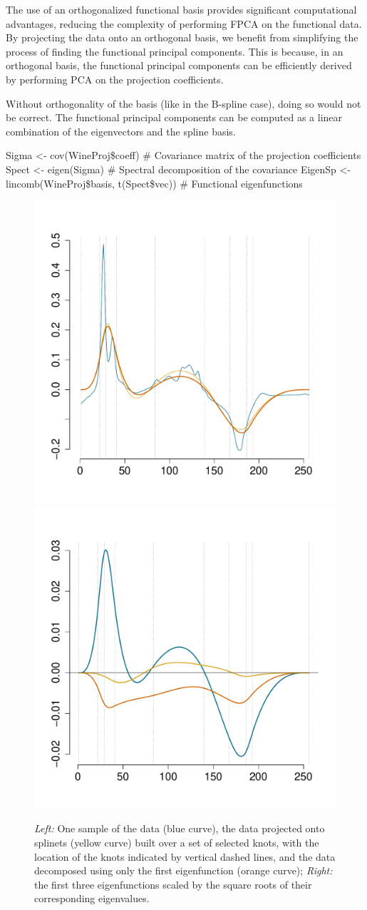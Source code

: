 The use of an orthogonalized functional basis provides significant computational advantages, reducing the complexity of performing FPCA on the functional data. By projecting the data onto an orthogonal basis, we benefit from simplifying the process of finding the functional principal components. This is because, in an orthogonal basis, the functional principal components can be efficiently derived by performing PCA on the projection coefficients.

Without orthogonality of the basis (like in the B-spline case), doing so would not be correct. The functional principal components can be computed as a linear combination of the eigenvectors and the spline basis.

\begin{example}
Sigma <- cov(WineProj\$coeff)    # Covariance matrix of the projection coefficients
Spect <- eigen(Sigma)            # Spectral decomposition of the covariance
EigenSp <- lincomb(WineProj\$basis, t(Spect\$vec))  # Functional eigenfunctions
\end{example}

\begin{figure}[t]
    \centering
    \includegraphics[width=0.5\linewidth]{figures/Fig5LeftFhatWine.pdf}\hspace{-2mm}
    \includegraphics[width=0.5\linewidth]{figures/Fig5RightEigenFuncWine.pdf}
    \caption{ \emph{Left:} One sample of the data (blue curve), the data projected onto splinets (yellow curve) built over a set of selected knots, with the location of the knots indicated by vertical dashed lines, and the data decomposed using only the first eigenfunction (orange curve); \emph{Right:} the first three eigenfunctions scaled by the square roots of their corresponding eigenvalues.}
    \label{fig:eigen}
\end{figure}

